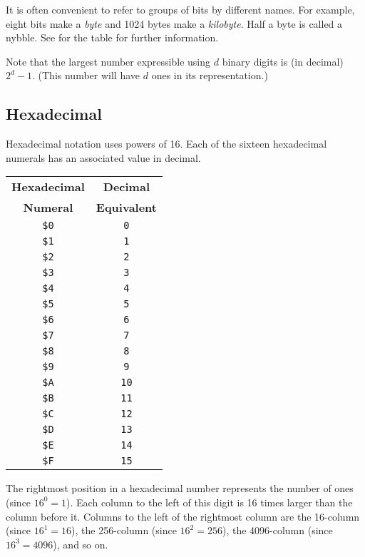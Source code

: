 It is often convenient to refer to groups of bits by different names. For example, eight bits make a {\it byte} and 1024 bytes make a {\it kilobyte}. Half a byte is called a nybble.
See  for the  table for further information.

Note that the largest number expressible using $d$ binary digits is (in decimal) $2^{d} - 1$. (This number will have $d$ ones in its representation.)

\subsection{Hexadecimal}
Hexadecimal notation uses powers of 16. Each of the sixteen hexadecimal numerals has an associated value in decimal.

\begin{center}
	\begin{tabular}{|c|c|}
		\hline
		{\bf Hexadecimal} & {\bf Decimal} \\
		{\bf Numeral} & {\bf Equivalent} \\ \hhline{|=|=|}
		\texttt{\$0} & \texttt{0} \\ \hline
		\texttt{\$1} & \texttt{1} \\ \hline
		\texttt{\$2} & \texttt{2} \\ \hline
		\texttt{\$3} & \texttt{3} \\ \hline
		\texttt{\$4} & \texttt{4} \\ \hline
		\texttt{\$5} & \texttt{5} \\ \hline
		\texttt{\$6} & \texttt{6} \\ \hline
		\texttt{\$7} & \texttt{7} \\ \hline
		\texttt{\$8} & \texttt{8} \\ \hline
		\texttt{\$9} & \texttt{9} \\ \hline
		\texttt{\$A} & \texttt{10} \\ \hline
		\texttt{\$B} & \texttt{11} \\ \hline
		\texttt{\$C} & \texttt{12} \\ \hline
		\texttt{\$D} & \texttt{13} \\ \hline
		\texttt{\$E} & \texttt{14} \\ \hline
		\texttt{\$F} & \texttt{15} \\ \hline
	\end{tabular}
\end{center}

The rightmost position in a hexadecimal number represents the number of ones (since $16^{0} = 1$). Each column to the left of this digit is 16 times larger than the column before it. Columns to the left of the rightmost column are the 16-column (since $16^{1} = 16$), the 256-column (since $16^{2} = 256$), the 4096-column (since $16^{3} = 4096$), and so on.

